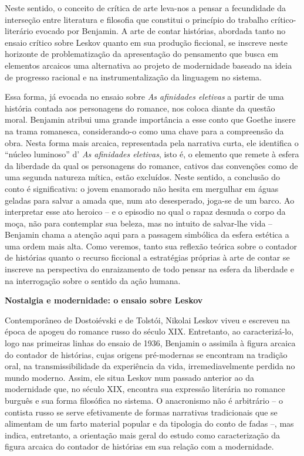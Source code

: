 Neste sentido, o conceito de crítica de arte leva-nos a pensar a
fecundidade da interseção entre literatura e filosofia que constitui o
princípio do trabalho crítico-literário evocado por Benjamin. A arte de
contar histórias, abordada tanto no ensaio crítico sobre Leskov quanto
em sua produção ficcional, se inscreve neste horizonte de
problematização da apresentação do pensamento que busca em elementos
arcaicos uma alternativa ao projeto de modernidade baseado na ideia de
progresso racional e na instrumentalização da linguagem no sistema.

Essa forma, já evocada no ensaio sobre \emph{As afinidades eletivas} a
partir de uma história contada aos personagens do romance, nos coloca
diante da questão moral. Benjamin atribui uma grande importância a esse
conto que Goethe insere na trama romanesca, considerando-o como uma
chave para a compreensão da obra. Nesta forma mais arcaica, representada
pela narrativa curta, ele identifica o ``núcleo luminoso'' d' \emph{As
afinidades eletivas}, isto é, o elemento que remete à esfera da
liberdade da qual os personagens do romance, cativos das convenções como
de uma segunda natureza mítica, estão excluídos. Neste sentido, a
conclusão do conto é significativa: o jovem enamorado não hesita em
mergulhar em águas geladas para salvar a amada que, num ato desesperado,
joga-se de um barco. Ao interpretar esse ato heroico -- e o episodio no
qual o rapaz desnuda o corpo da moça, não para contemplar sua beleza,
mas no intuito de salvar-lhe vida -- Benjamin chama a atenção aqui para
a passagem simbólica da esfera estética a uma ordem mais alta. Como
veremos, tanto sua reflexão teórica sobre o contador de histórias quanto
o recurso ficcional a estratégias próprias à arte de contar se inscreve
na perspectiva do enraizamento de todo pensar na esfera da liberdade e
na interrogação sobre o sentido da ação humana.

\textbf{Nostalgia e modernidade: o ensaio sobre Leskov}

Contemporâneo de Dostoiévski e de Tolstói, Nikolai Leskov viveu e
escreveu na época de apogeu do romance russo do século XIX. Entretanto,
ao caracterizá-lo, logo nas primeiras linhas do ensaio de 1936, Benjamin
o assimila à figura arcaica do contador de histórias, cujas origens
pré-modernas se encontram na tradição oral, na transmissibilidade da
experiência da vida, irremediavelmente perdida no mundo moderno. Assim,
ele situa Leskov num passado anterior ao da modernidade que, no século
XIX, encontra sua expressão literária no romance burguês e sua forma
filosófica no sistema. O anacronismo não é arbitrário -- o contista
russo se serve efetivamente de formas narrativas tradicionais que se
alimentam de um farto material popular e da tipologia do conto de fadas
--, mas indica, entretanto, a orientação mais geral do estudo como
caracterização da figura arcaica do contador de histórias em sua relação
com a modernidade.

